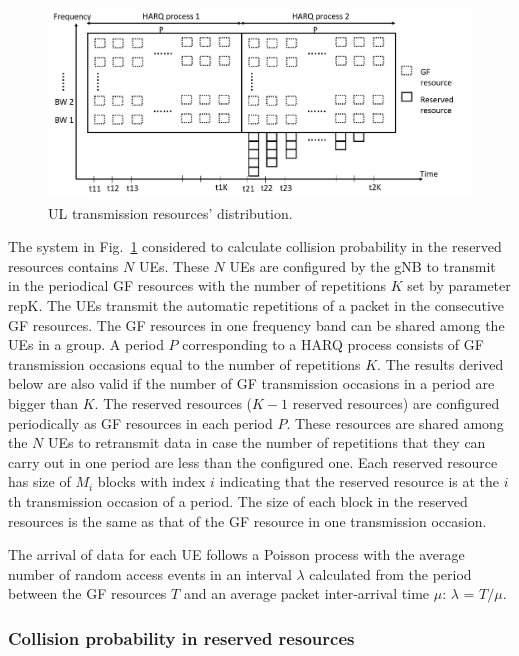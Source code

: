\documentclass{ieeeaccess}
\begin{document}
\begin{figure}[htbp]
\centerline{\includegraphics[scale=0.25]{fig6.png}}
\caption{UL transmission resources' distribution.}
\label{fig6}
\vspace{-2mm}
\end{figure}

The system in Fig.~\ref{fig6} considered to calculate collision probability in the reserved resources contains $N$ UEs. These $N$ UEs are configured by the gNB to transmit in the periodical GF resources with the number of repetitions $K$ set by parameter repK. The UEs transmit the automatic repetitions of a packet in the consecutive GF resources. The GF resources in one frequency band can be shared among the UEs in a group. A period $P$ corresponding to a HARQ process consists of GF transmission occasions equal to the number of repetitions $K$. The results derived below are also valid if the number of GF transmission occasions in a period are bigger than $K$. The reserved resources ($K-1$ reserved resources) are configured periodically as GF resources in each period $P$. These resources are shared among the $N$ UEs to retransmit data in case the number of repetitions that they can carry out in one period are less than the configured one. Each reserved resource has size of $M_{i}$ blocks with index $i$ indicating that the reserved resource is at the $i$th transmission occasion of a period. The size of each block in the reserved resources is the same as that of the GF resource in one transmission occasion.

The arrival of data for each UE follows a Poisson process with the average number of random access events in an interval $\lambda$ calculated from the period between the GF resources $T$ and an average packet inter-arrival time $\mu$: $\lambda$ = $T/\mu$.

\subsubsection{Collision probability in reserved resources}\label{IIIB3}
\end{document}
